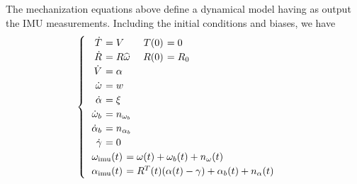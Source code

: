 The mechanization equations above define a dynamical model having as output the IMU measurements. Including the initial conditions and biases, we have
\begin{equation}
\begin{cases}
\begin{tabular}{>{$}r<{$} >{$\!\!\!\!\!}l<{$} >{$}r<{$} >{$\!\!\!\!\!}l<{$}}
\dot T &= V & T(0) &= 0 \\
\dot R &= R \widehat \w & R(0) &= R_0\\
\dot V &= \alpha \\ %
\dot \w &= w\\ %
\dot \alpha &= \xi \\%
\dot \w_b &= n_{\w_b}  \\
\dot \alpha_b &= n_{\alpha_b}  \\ 
\dot \gamma &= 0 \\
\end{tabular}\\
\begin{tabular}{>{$}r<{$} >{$\!\!\!\!\!}l<{$}}
\w\imu (t) &= \w(t) + \w_b(t) + n_{\w}(t) \\ 
\alpha\imu (t) &= R^T(t) (\alpha(t)- \gamma) + \alpha_b(t) + n_{\alpha}(t) 
\end{tabular}
\end{cases}
\end{equation}
